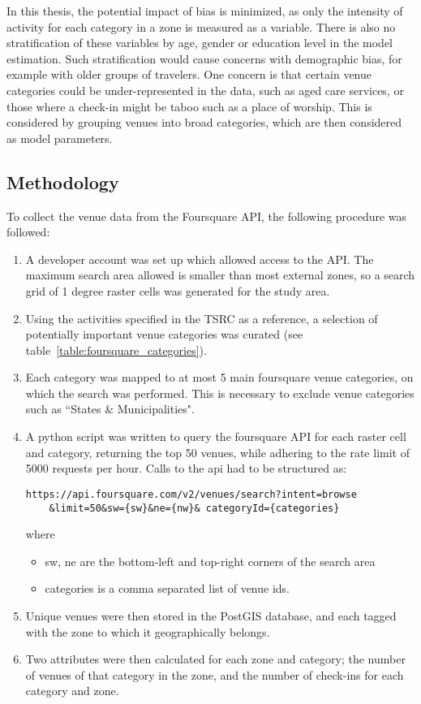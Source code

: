 In this thesis, the potential impact of bias is minimized, as only the intensity of activity for each category in a zone is measured as a variable. There is also no stratification of these variables by age, gender or education level in the model estimation. Such stratification would cause concerns with demographic bias, for example with older groups of travelers. One concern is that certain venue categories could be under-represented in the data, such as aged care services, or those where a check-in might be taboo such as a place of worship. This is considered by grouping venues into broad categories, which are then considered as model parameters.
	
\subsection{Methodology}
To collect the venue data from the Foursquare API, the following procedure was followed:
\begin{enumerate}

\item A developer account was set up which allowed access to the API. The maximum search area allowed is smaller than most external zones, so a search grid of 1 degree raster cells was generated for the study area. 

\item Using the activities specified in the TSRC as a reference, a selection of potentially important venue categories was curated (see table~\ref{table:foursquare_categories}).

\item Each category was mapped to at most 5 main foursquare venue categories, on which the search was performed. This is necessary to exclude venue categories such as ``States \& Municipalities".

\item A python script was written to query the foursquare API for each raster cell and category, returning the top 50 venues, while adhering to the rate limit of 5000 requests per hour. Calls to the api had to be structured as:
\begin{verbatim}
https://api.foursquare.com/v2/venues/search?intent=browse
    &limit=50&sw={sw}&ne={nw}& categoryId={categories}
\end{verbatim}
where 
\begin{itemize}
\item sw, ne are the bottom-left and top-right corners of the search area
\item categories is a comma separated list of venue ids.
\end{itemize}

\item Unique venues were then stored in the PostGIS database, and each tagged with the zone to which it geographically belongs.
\item Two attributes were then calculated for each zone and category; the number of venues of that category in the zone, and the number of check-ins for each category and zone.
\end{enumerate}

